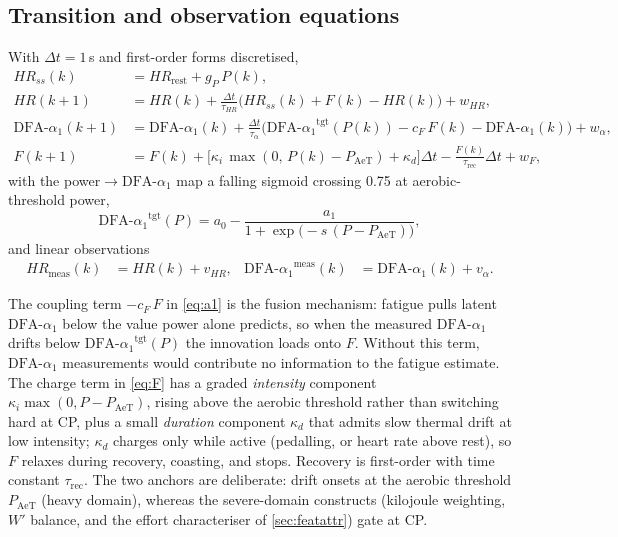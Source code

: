 \documentclass[11pt]{article}
\newcommand{\aone}{\ensuremath{\text{DFA-}\alpha_1}}
\newcommand{\Fstate}{\ensuremath{F}}
\begin{document}
\subsection{Transition and observation equations}\label{sec:transitions}
With $\Delta t = 1$\,s and first-order forms discretised,
\begin{align}
HR_{ss}(k) &= HR_{\text{rest}} + g_P\,P(k), \label{eq:hrss}\\
HR(k{+}1) &= HR(k) + \tfrac{\Delta t}{\tau_{HR}}\big(HR_{ss}(k) + \Fstate(k) - HR(k)\big) + w_{HR}, \label{eq:hr}\\
\aone(k{+}1) &= \aone(k) + \tfrac{\Delta t}{\tau_{\alpha}}\big(\aone^{\text{tgt}}(P(k)) - c_F\,\Fstate(k) - \aone(k)\big) + w_{\alpha}, \label{eq:a1}\\
\Fstate(k{+}1) &= \Fstate(k) + \big[\kappa_i\,\max(0,\,P(k)-P_{\text{AeT}}) + \kappa_d\big]\Delta t - \tfrac{\Fstate(k)}{\tau_{\text{rec}}}\Delta t + w_{F}, \label{eq:F}
\end{align}
with the power$\rightarrow$$\aone$ map a falling sigmoid crossing 0.75 at aerobic-threshold power,
\begin{equation}
\aone^{\text{tgt}}(P) = a_0 - \frac{a_1}{1 + \exp\!\big(-s\,(P - P_{\text{AeT}})\big)},
\label{eq:sigmoid}
\end{equation}
and linear observations
\begin{align}
HR_{\text{meas}}(k) &= HR(k) + v_{HR}, &
\aone^{\text{meas}}(k) &= \aone(k) + v_{\alpha}.
\label{eq:obs}
\end{align}

The coupling term $-c_F\,\Fstate$ in \autoref{eq:a1} is the fusion mechanism: fatigue pulls latent $\aone$ below the value power alone predicts, so when the measured $\aone$ drifts below $\aone^{\text{tgt}}(P)$ the innovation loads onto $\Fstate$. Without this term, $\aone$ measurements would contribute no information to the fatigue estimate. The charge term in \autoref{eq:F} has a graded \emph{intensity} component $\kappa_i\max(0,P-P_{\text{AeT}})$, rising above the aerobic threshold rather than switching hard at CP, plus a small \emph{duration} component $\kappa_d$ that admits slow thermal drift at low intensity; $\kappa_d$ charges only while active (pedalling, or heart rate above rest), so $\Fstate$ relaxes during recovery, coasting, and stops. Recovery is first-order with time constant $\tau_{\text{rec}}$. The two anchors are deliberate: drift onsets at the aerobic threshold $P_{\text{AeT}}$ (heavy domain), whereas the severe-domain constructs (kilojoule weighting, $W'$ balance, and the effort characteriser of \autoref{sec:featattr}) gate at CP.
\end{document}
